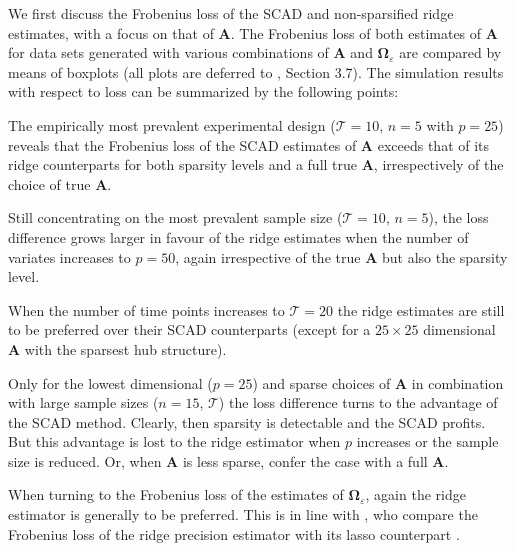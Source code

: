We first discuss the Frobenius loss of the SCAD and non-sparsified ridge estimates, with a focus on that of $\mathbf{A}$. The Frobenius loss of both estimates of $\mathbf{A}$ for data sets generated with various combinations of $\mathbf{A}$ and $\mathbf{\Omega}_{\varepsilon}$ are compared by means of boxplots (all plots are deferred to \cite{Supp2018}, Section 3.7). The simulation results with respect to loss can be summarized by the following points:
\begin{compactitem}
\item The empirically most prevalent experimental design ($\mathcal{T}=10$, $n=5$ with $p=25$) reveals that the Frobenius loss of the SCAD estimates of $\mathbf{A}$ exceeds that of its ridge counterparts for both sparsity levels and a full true $\mathbf{A}$, irrespectively of the choice of true $\mathbf{A}$.

\item Still concentrating on the most prevalent sample size ($\mathcal{T}=10$, $n=5$), the loss difference grows larger in favour of the ridge estimates when the number of variates increases to $p=50$, again irrespective of the true $\mathbf{A}$ but also the sparsity level.

\item When the number of time points increases to $\mathcal{T}=20$ the ridge estimates are still to be preferred over their SCAD counterparts (except for a $25 \times 25$ dimensional $\mathbf{A}$ with the sparsest hub structure). 

\item Only for the lowest dimensional ($p=25$) and sparse choices of $\mathbf{A}$ in combination with large sample sizes ($n=15$, $\mathcal{T}$) the loss difference turns to the advantage of the SCAD method. Clearly, then sparsity is detectable and the SCAD profits. But this advantage is lost to the ridge estimator when $p$ increases or the sample size is reduced. Or, when $\mathbf{A}$ is less sparse, confer the case with a full $\mathbf{A}$.


\item When turning to the Frobenius loss of the estimates of $\mathbf{\Omega}_{\varepsilon}$, again the ridge estimator is generally to be preferred. This is in line with \cite{Wieringen2016}, who compare the Frobenius loss of the ridge precision estimator with its lasso counterpart \citep{Friedman2008}.
\end{compactitem}


